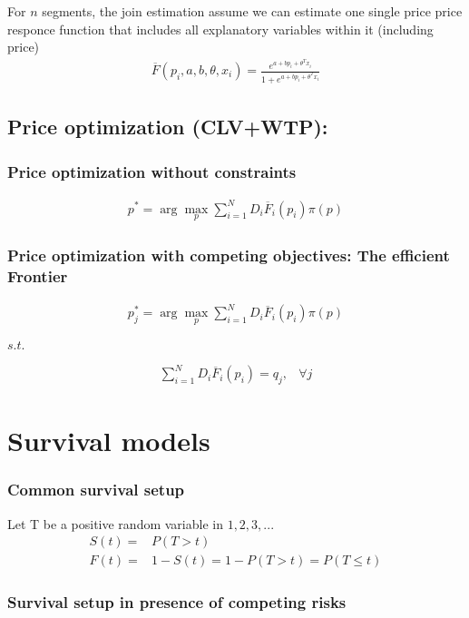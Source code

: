 \documentclass[12pt]{book}
\begin{document}
For $n$ segments, the join estimation assume we can estimate one single price price responce function that includes all explanatory variables within it (including price)
\begin{align}
\overline{F}(p_i,a,b,\theta,x_i)=\frac{e^{a+b p_i+\theta^T x_i}}{1+e^{a+b p_i+\theta^T x_i}}
\end{align}

\section{Price optimization (CLV+WTP): }
\subsection{Price optimization without constraints}
\begin{align}
p^*= \arg \max_p \sum_{i=1}^N D_i\overline{F}_i(p_i)\pi(p)
\end{align}

\subsection{Price optimization with competing objectives: The efficient Frontier}

\begin{align}
p^*_j= \arg \max_p \sum_{i=1}^N D_i\overline{F}_i(p_i)\pi(p)
\end{align}
\begin{center}
    $s.t.$
\end{center}
\begin{align}
\sum_{i=1}^N D_i\overline{F}_i(p_i) =q_j,& \forall j
\end{align}


\chapter{Survival models}
\subsection{Common survival setup}
Let T be a positive random variable in $1,2,3,...$
\begin{align}
    S(t)=&P(T>t) \\
    F(t)=&1-S(t)=1-P(T>t)=P(T\leq t)
\end{align}
\subsection{Survival setup in presence of competing risks}
\end{document}
